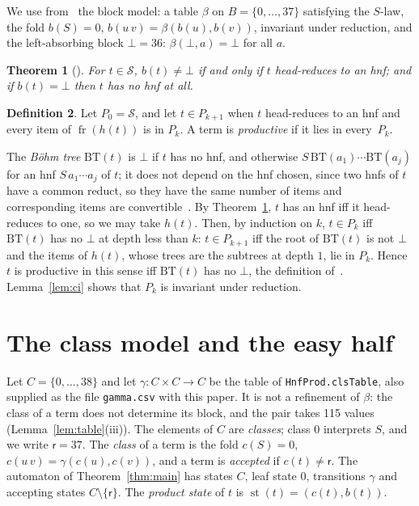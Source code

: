 \documentclass[11pt]{amsart}
\newtheorem{theorem}{Theorem}
\theoremstyle{definition}
\newtheorem{definition}[theorem]{Definition}
\theoremstyle{remark}
\newcommand{\spine}{\operatorname{fr}}
\newcommand{\lean}[1]{\texttt{#1}}
\newcommand{\rej}{\mathsf{r}}
\newcommand{\st}{\operatorname{st}}
\begin{document}
We use from~\citep{s1} the block model: a table $\beta$ on $B=\{0,\dots,37\}$ satisfying the
$S$-law, the fold $b(S)=0$, $b(u\,v)=\beta(b(u),b(v))$, invariant under reduction, and the
left-absorbing block $\bot=36$: $\beta(\bot,a)=\bot$ for all $a$.

\begin{theorem}[\citep{s1}]\label{thm:s1}
For $t\in\mathcal S$, $b(t)\ne\bot$ if and only if $t$ head-reduces to an hnf; and if
$b(t)=\bot$ then $t$ has no hnf at all.
\end{theorem}

\begin{definition}
Let $P_0=\mathcal S$, and let $t\in P_{k+1}$ when $t$ head-reduces to an hnf and every item
of $\spine(h(t))$ is in $P_k$. A term is \emph{productive} if it lies in every~$P_k$.
\end{definition}

The \emph{B\"ohm tree} $\mathrm{BT}(t)$ is $\bot$ if $t$ has no hnf, and otherwise
$S\,\mathrm{BT}(a_1)\cdots\mathrm{BT}(a_j)$ for an hnf $S\,a_1\cdots a_j$ of $t$; it does not
depend on the hnf chosen, since two hnfs of $t$ have a common reduct, so they have the same
number of items and corresponding items are convertible~\citep{barendregt}. By
Theorem~\ref{thm:s1}, $t$ has an hnf iff it head-reduces to one, so we may take $h(t)$. Then,
by induction on $k$, $t\in P_k$ iff $\mathrm{BT}(t)$ has no $\bot$ at depth less than $k$:
$t\in P_{k+1}$ iff the root of $\mathrm{BT}(t)$ is not $\bot$ and the items of $h(t)$, whose
trees are the subtrees at depth $1$, lie in $P_k$. Hence $t$ is productive in this sense iff
$\mathrm{BT}(t)$ has no $\bot$, the definition of~\citep{dots}. Lemma~\ref{lem:ci} shows that
$P_k$ is invariant under reduction.

\section{The class model and the easy half}\label{sec:model}

Let $C=\{0,\dots,38\}$ and let $\gamma\colon C\times C\to C$ be the table of
\lean{HnfProd.clsTable}, also supplied as the file \texttt{gamma.csv} with this paper. It is
not a refinement of $\beta$: the class of a term does not determine its block, and the pair
takes 115 values (Lemma~\ref{lem:table}(iii)). The elements of $C$ are \emph{classes}; class $0$ interprets $S$, and we
write $\rej=37$. The \emph{class} of a term is the fold $c(S)=0$,
$c(u\,v)=\gamma(c(u),c(v))$, and a term is \emph{accepted} if $c(t)\ne\rej$. The automaton
of Theorem~\ref{thm:main} has states $C$, leaf state $0$, transitions $\gamma$ and
accepting states $C\setminus\{\rej\}$. The \emph{product state} of $t$ is
$\st(t)=(c(t),b(t))$.
\end{document}
